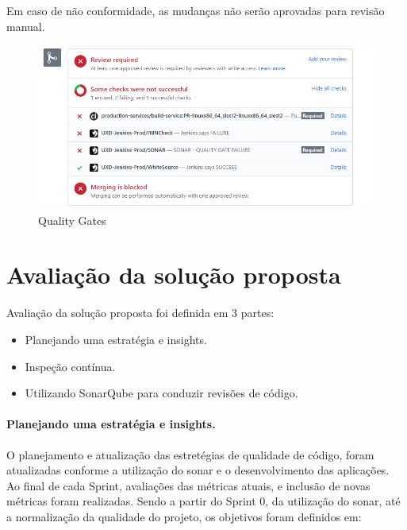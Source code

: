 \documentclass[12pt]{article}
\begin{document}
Em caso de não conformidade, as mudanças não serão aprovadas para revisão manual.

\begin{figure}[h]
	\centering
		\includegraphics[scale=0.5]{img/sonar-check-quality-gate-fail.png}
	\caption{Quality Gates}
	\label{fig:sonar-quality-gates}
\end{figure}

		
\part{Avaliação da solução proposta} \label{sec:avaliacao}
 Avaliação da solução proposta foi definida em 3 partes:
 
 \begin{itemize}
 	\item Planejando uma estratégia e insights.	
 	\item Inspeção contínua.
 	\item Utilizando SonarQube para conduzir revisões de código.
 \end{itemize}

\subsection{Planejando uma estratégia e insights.} \label{sec:sonar-planning}

O planejamento e atualização das estretégias de qualidade de código, foram atualizadas conforme a utilização do sonar e o desenvolvimento das aplicações.
Ao final de cada Sprint, avaliações das métricas atuais, e inclusão de novas métricas foram realizadas.
Sendo a partir do Sprint 0, da utilização do sonar, até a normalização da qualidade do projeto, os objetivos foram definidos em:
\end{document}
